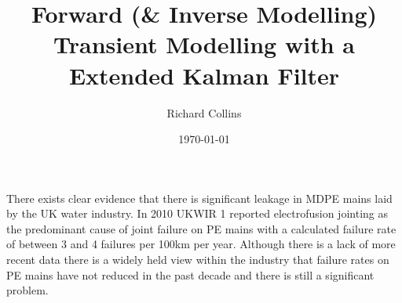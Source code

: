 \documentclass[]{article}
\date{\today}
\title{Forward (\& Inverse Modelling) Transient Modelling with a Extended Kalman Filter}
\author{Richard Collins}
\begin{document}
\maketitle

\begin{abstract}
 
\end{abstract}

There exists clear evidence that there is significant leakage in MDPE mains laid 
by the UK water industry. In 2010 UKWIR 1 reported electrofusion jointing as 
the predominant cause of joint failure on PE mains with a calculated failure 
rate of between 3 and 4 failures per 100km per year. Although there is a lack 
of more recent data there is a widely held view within the industry that 
failure rates on PE mains have not reduced in the past decade and there is still
a significant problem.
\end{document}
